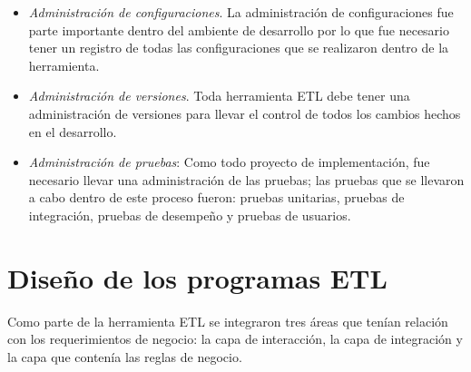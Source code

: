 \begin{itemize}
\item \textit{Administración de configuraciones}. La administración de
  configuraciones fue parte importante dentro del ambiente de desarrollo por lo
  que fue necesario tener un registro de todas las configuraciones que se
  realizaron dentro de la herramienta.

\item \textit{Administración de versiones}. Toda herramienta ETL debe tener una
  administración de versiones para llevar el control de todos los cambios hechos
  en el desarrollo.

\item \textit{Administración de pruebas}: Como todo proyecto de implementación,
  fue necesario llevar una administración de las pruebas; las pruebas que se
  llevaron a cabo dentro de este proceso fueron: pruebas unitarias, pruebas de
  integración, pruebas de desempeño y pruebas de usuarios.

\end{itemize}

\section{Diseño de los programas ETL}

Como parte de la herramienta ETL se integraron tres áreas que tenían relación
con los requerimientos de negocio: la capa de interacción, la capa de
integración y la capa que contenía las reglas de negocio.

